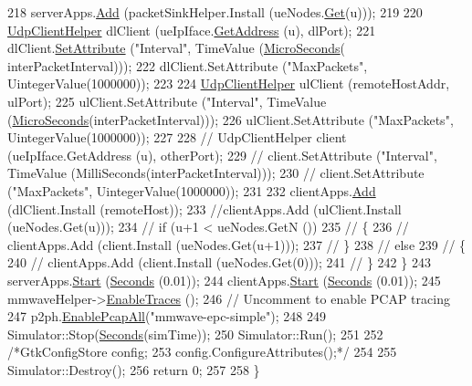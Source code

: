 \begin{DoxyCode}
218       serverApps.\hyperlink{classns3_1_1ApplicationContainer_ad09ab1a1ad5849d518d5f4c262e38152}{Add} (packetSinkHelper.Install (ueNodes.\hyperlink{classns3_1_1NodeContainer_a9ed96e2ecc22e0f5a3d4842eb9bf90bf}{Get}(u)));
219 
220       \hyperlink{classns3_1_1UdpClientHelper}{UdpClientHelper} dlClient (ueIpIface.\hyperlink{classns3_1_1Ipv4InterfaceContainer_ae63208dcd222be986822937ee4aa828c}{GetAddress} (u), dlPort);
221       dlClient.\hyperlink{classns3_1_1UdpClientHelper_a8bbae16a28f85ab3f3b5aa4642edfeae}{SetAttribute} (\textcolor{stringliteral}{"Interval"}, TimeValue (\hyperlink{group__timecivil_ga17465a639c8d1464e76538afdd78a9f0}{MicroSeconds}(
      interPacketInterval)));
222       dlClient.SetAttribute (\textcolor{stringliteral}{"MaxPackets"}, UintegerValue(1000000));
223 
224       \hyperlink{classns3_1_1UdpClientHelper}{UdpClientHelper} ulClient (remoteHostAddr, ulPort);
225       ulClient.SetAttribute (\textcolor{stringliteral}{"Interval"}, TimeValue (\hyperlink{group__timecivil_ga17465a639c8d1464e76538afdd78a9f0}{MicroSeconds}(interPacketInterval)));
226       ulClient.SetAttribute (\textcolor{stringliteral}{"MaxPackets"}, UintegerValue(1000000));
227 
228 \textcolor{comment}{//      UdpClientHelper client (ueIpIface.GetAddress (u), otherPort);}
229 \textcolor{comment}{//      client.SetAttribute ("Interval", TimeValue (MilliSeconds(interPacketInterval)));}
230 \textcolor{comment}{//      client.SetAttribute ("MaxPackets", UintegerValue(1000000));}
231 
232       clientApps.\hyperlink{classns3_1_1ApplicationContainer_ad09ab1a1ad5849d518d5f4c262e38152}{Add} (dlClient.Install (remoteHost));
233       \textcolor{comment}{//clientApps.Add (ulClient.Install (ueNodes.Get(u)));}
234 \textcolor{comment}{//      if (u+1 < ueNodes.GetN ())}
235 \textcolor{comment}{//        \{}
236 \textcolor{comment}{//          clientApps.Add (client.Install (ueNodes.Get(u+1)));}
237 \textcolor{comment}{//        \}}
238 \textcolor{comment}{//      else}
239 \textcolor{comment}{//        \{}
240 \textcolor{comment}{//          clientApps.Add (client.Install (ueNodes.Get(0)));}
241 \textcolor{comment}{//        \}}
242     \}
243   serverApps.\hyperlink{classns3_1_1ApplicationContainer_a8eff87926507020bbe3e1390358a54a7}{Start} (\hyperlink{group__timecivil_ga33c34b816f8ff6628e33d5c8e9713b9e}{Seconds} (0.01));
244   clientApps.\hyperlink{classns3_1_1ApplicationContainer_a8eff87926507020bbe3e1390358a54a7}{Start} (\hyperlink{group__timecivil_ga33c34b816f8ff6628e33d5c8e9713b9e}{Seconds} (0.01));
245   mmwaveHelper->\hyperlink{classns3_1_1MmWaveHelper_a4eae3871876b62965d612d9a56ed21bc}{EnableTraces} ();
246   \textcolor{comment}{// Uncomment to enable PCAP tracing}
247   p2ph.\hyperlink{classns3_1_1PcapHelperForDevice_a4ab183a2512120200d4a0e5d8ececd49}{EnablePcapAll}(\textcolor{stringliteral}{"mmwave-epc-simple"});
248 
249   Simulator::Stop(\hyperlink{group__timecivil_ga33c34b816f8ff6628e33d5c8e9713b9e}{Seconds}(simTime));
250   Simulator::Run();
251 
252   \textcolor{comment}{/*GtkConfigStore config;}
253 \textcolor{comment}{  config.ConfigureAttributes();*/}
254 
255   Simulator::Destroy();
256   \textcolor{keywordflow}{return} 0;
257 
258 \}
\end{DoxyCode}


